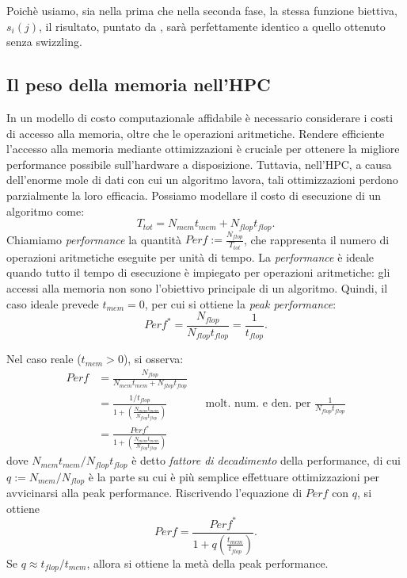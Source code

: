 Poichè usiamo, sia nella prima che nella seconda fase, la stessa funzione biettiva, \(s_i(j)\), il risultato, puntato da , sarà perfettamente identico a quello ottenuto senza swizzling.

\subsection{Il peso della memoria nell'HPC}
In un modello di costo computazionale affidabile è necessario considerare i costi di accesso alla memoria, oltre che le operazioni aritmetiche. 
Rendere efficiente l'accesso alla memoria mediante ottimizzazioni è cruciale per ottenere la migliore performance possibile sull'hardware a disposizione.
Tuttavia, nell'HPC, a causa dell'enorme mole di dati con cui un algoritmo lavora, tali ottimizzazioni perdono parzialmente la loro efficacia.
Possiamo modellare il costo di esecuzione di un algoritmo come:
\[ T_{tot} = N_{mem}t_{mem} + N_{flop}t_{flop}. \]
Chiamiamo \emph{performance} la quantità \(Perf := \frac{N_{flop}}{T_{tot}}\), che rappresenta il numero di operazioni aritmetiche eseguite per unità di tempo. La \emph{performance} è ideale quando tutto il tempo di esecuzione è impiegato per operazioni aritmetiche: gli accessi alla memoria non sono l'obiettivo principale di un algoritmo.
Quindi, il caso ideale prevede \(t_{mem} = 0\), per cui si ottiene la \emph{peak performance}:
\[ 
    Perf^* = \frac{N_{flop}}{N_{flop}t_{flop}} = \frac{1}{t_{flop}}.
\]

\noindent
Nel caso reale (\(t_{mem} > 0\)), si osserva:
\[
\begin{aligned}
    Perf &=  \frac{N_{flop}}{N_{mem}t_{mem} + N_{flop}t_{flop}} \\
    &= \frac{1/t_{flop}}{1 + \left(\frac{N_{mem}t_{mem}}{N_{flop}t_{flop}}\right)} && \text{molt. num. e den. per } \frac{1}{N_{flop}t_{flop}} \\
    &= \frac{Perf^*}{1 + \left(\frac{N_{mem}t_{mem}}{N_{flop}t_{flop}}\right)}
\end{aligned}
\]
dove \(N_{mem}t_{mem}/N_{flop}t_{flop}\) è detto \emph{fattore di decadimento} della performance, di cui \(q := N_{mem}/N_{flop}\) è la parte su cui è più semplice effettuare ottimizzazioni per avvicinarsi alla peak performance.
Riscrivendo l'equazione di \(Perf\) con \(q\), si ottiene
\[ Perf = \frac{Perf^*}{1 + q\left(\frac{t_{mem}}{t_{flop}}\right)}. \]
Se \(q \approx t_{flop}/t_{mem}\), allora si ottiene la metà della peak performance.

